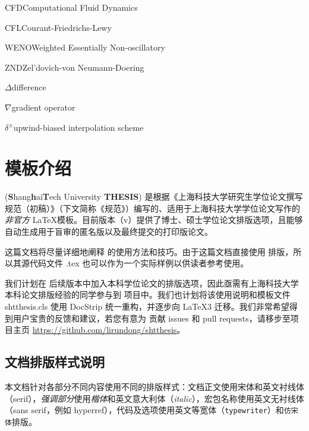 \documentclass[bachelor, comfort]{shtthesis}
\begin{document}
\begin{nomenclatures}[缩写]
  \item{CFD}{Computational Fluid Dynamics}
  \item{CFL}{Courant-Friedrichs-Lewy}
  \item{WENO}{Weighted Essentially Non-oscillatory}
  \item{ZND}{Zel'dovich-von Neumann-Doering}
\end{nomenclatures}

\begin{nomenclatures}[算子 \& 说明]
  \item{$\Delta$}{difference}
  \item{$\nabla$}{gradient operator}
  \item{$\delta^{\pm}$}{upwind-biased interpolation scheme}
\end{nomenclatures}
\fi

\mainmatter
\chapter{模板介绍}
\shtthesis{} (\textbf{S}hang\textbf{h}ai\textbf{T}ech University \textbf{THESIS}) 是根据《上海科技大学研究生学位论文撰写规范（初稿）》（下文简称《规范》）编写的、适用于上海科技大学学位论文写作的\emph{非官方} \LaTeX 模板。目前版本（v\version{}）提供了博士、硕士学位论文排版选项，且能够自动生成用于盲审的匿名版以及最终提交的打印版论文。

这篇文档将尽量详细地阐释 \shtthesis{} 的使用方法和技巧。由于这篇文档直接使用 \shtthesis{} 排版，所以其源代码文件 \jobname.tex 也可以作为一个实际样例以供读者参考使用。

我们计划在 \shtthesis{} 后续版本中加入本科学位论文的排版选项，因此亟需有上海科技大学本科论文排版经验的同学参与到 \shtthesis{} 项目中。我们也计划将该使用说明和模板文件 shtthesis.cls 使用 \textsf{DocStrip} 统一重构，并逐步向 \LaTeX3 迁移。我们非常希望得到用户宝贵的反馈和建议，若您有意为 \shtthesis{} 贡献 issues 和 pull requests，请移步至项目主页 \url{https://github.com/lirundong/shtthesis}。

\section*{文档排版样式说明}
本文档针对各部分不同内容使用不同的排版样式：文档正文使用宋体和英文衬线体（serif），\emph{强调部分}使用\emph{楷体}和英文意大利体（\emph{italic}），宏包名称使用英文无衬线体（\textsf{sans serif}，例如 \textsf{hyperref}），代码及选项使用英文等宽体（\texttt{typewriter}）和\texttt{仿宋体}排版。
\end{document}
